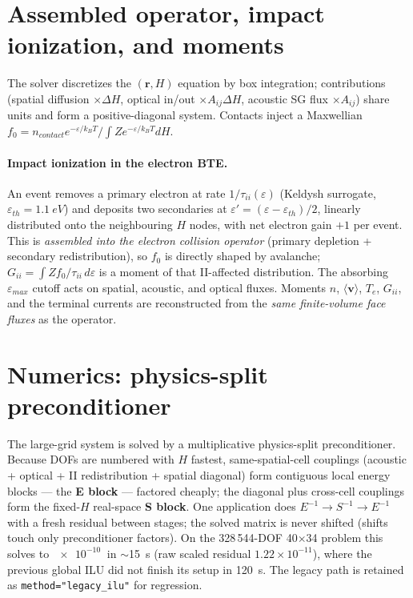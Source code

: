 \documentclass[11pt]{article}
\newcommand{\eps}{\varepsilon}
\newcommand{\vecr}{\mathbf{r}}
\begin{document}
\section{Assembled operator, impact ionization, and moments}\label{sec:core}
The solver discretizes the $(\vecr,H)$ equation by box integration; contributions (spatial
diffusion $\times\Delta H$, optical in/out $\times A_{ij}\Delta H$, acoustic SG flux $\times
A_{ij}$) share units and form a positive-diagonal system. Contacts inject a Maxwellian
$f_0=n_{contact}e^{-\eps/k_BT}/\!\int Ze^{-\eps/k_BT}dH$.

\paragraph{Impact ionization in the electron BTE.} An event removes a primary electron at rate
$1/\tau_{ii}(\eps)$ (Keldysh surrogate, $\eps_{th}=\SI{1.1}{eV}$) and deposits two secondaries at
$\eps'=(\eps-\eps_{th})/2$, linearly distributed onto the neighbouring $H$ nodes, with net
electron gain $+1$ per event. This is \emph{assembled into the electron collision operator}
(primary depletion + secondary redistribution), so $f_0$ is directly shaped by avalanche;
$G_{ii}=\int Zf_0/\tau_{ii}\,d\eps$ is a moment of that II-affected distribution. The absorbing
$\eps_{max}$ cutoff acts on spatial, acoustic, and optical fluxes. Moments $n$, $\langle
\mathbf{v}\rangle$, $T_e$, $G_{ii}$, and the terminal currents are reconstructed from the
\emph{same finite-volume face fluxes} as the operator.

\section{Numerics: physics-split preconditioner}\label{sec:numerics}
The large-grid system is solved by a multiplicative physics-split preconditioner. Because DOFs
are numbered with $H$ fastest, same-spatial-cell couplings (acoustic + optical + II
redistribution + spatial diagonal) form contiguous local energy blocks --- the \textbf{E block}
--- factored cheaply; the diagonal plus cross-cell couplings form the fixed-$H$ real-space
\textbf{S block}. One application does $E^{-1}\!\to\!S^{-1}\!\to\!E^{-1}$ with a fresh residual
between stages; the solved matrix is never shifted (shifts touch only preconditioner factors).
On the 328\,544-DOF 40$\times$34 problem this solves to $\SI{e-10}{}$ in $\sim$15~s (raw scaled
residual $1.22\times10^{-11}$), where the previous global ILU did not finish its setup in
120~s. The legacy path is retained as \texttt{method="legacy\_ilu"} for regression.
\end{document}
